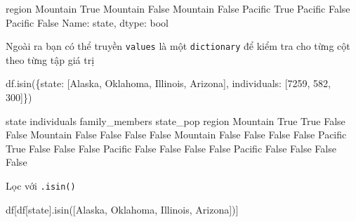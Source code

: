 \documentclass[
]{book}
\newenvironment{Shaded}{\begin{snugshade}}{\end{snugshade}}
\newcommand{\DecValTok}[1]{\textcolor[rgb]{0.00,0.00,0.81}{#1}}
\newcommand{\NormalTok}[1]{#1}
\newcommand{\StringTok}[1]{\textcolor[rgb]{0.31,0.60,0.02}{#1}}
\begin{document}
\begin{Shaded}
\begin{Highlighting}[]
\NormalTok{region}
\NormalTok{Mountain     True}
\NormalTok{Mountain    False}
\NormalTok{Mountain    False}
\NormalTok{Pacific      True}
\NormalTok{Pacific     False}
\NormalTok{Pacific     False}
\NormalTok{Name: state, dtype: bool}
\end{Highlighting}
\end{Shaded}

Ngoài ra bạn có thể truyền \texttt{values} là một \texttt{dictionary} để kiểm tra cho từng cột theo từng tập giá trị

\begin{Shaded}
\begin{Highlighting}[]
\NormalTok{df.isin(\{}\StringTok{\textquotesingle{}state\textquotesingle{}}\NormalTok{: [}\StringTok{\textquotesingle{}Alaska\textquotesingle{}}\NormalTok{, }\StringTok{\textquotesingle{}Oklahoma\textquotesingle{}}\NormalTok{, }\StringTok{\textquotesingle{}Illinois\textquotesingle{}}\NormalTok{, }\StringTok{\textquotesingle{}Arizona\textquotesingle{}}\NormalTok{], }
         \StringTok{\textquotesingle{}individuals\textquotesingle{}}\NormalTok{: [}\DecValTok{7259}\NormalTok{, }\DecValTok{582}\NormalTok{, }\DecValTok{300}\NormalTok{]\})}
\end{Highlighting}
\end{Shaded}

\begin{Shaded}
\begin{Highlighting}[]
\NormalTok{          state  individuals  family\_members  state\_pop}
\NormalTok{region                                                 }
\NormalTok{Mountain   True         True           False      False}
\NormalTok{Mountain  False        False           False      False}
\NormalTok{Mountain  False        False           False      False}
\NormalTok{Pacific    True        False           False      False}
\NormalTok{Pacific   False        False           False      False}
\NormalTok{Pacific   False        False           False      False}
\end{Highlighting}
\end{Shaded}

Lọc với \texttt{.isin()}

\begin{Shaded}
\begin{Highlighting}[]
\NormalTok{df[df[}\StringTok{\textquotesingle{}state\textquotesingle{}}\NormalTok{].isin([}\StringTok{\textquotesingle{}Alaska\textquotesingle{}}\NormalTok{, }\StringTok{\textquotesingle{}Oklahoma\textquotesingle{}}\NormalTok{, }\StringTok{\textquotesingle{}Illinois\textquotesingle{}}\NormalTok{, }\StringTok{\textquotesingle{}Arizona\textquotesingle{}}\NormalTok{])]}
\end{Highlighting}
\end{Shaded}
\end{document}
